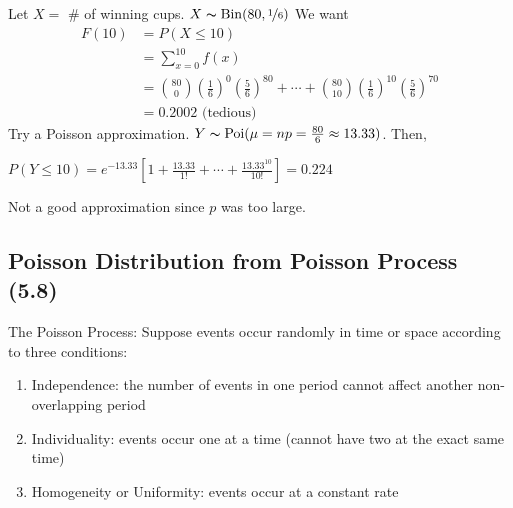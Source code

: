 Let $ X= $ \# of winning cups. $ X \thicksim \operatorname{Bin}(80,\nicefrac{1}{6}) $
We want
\begin{align*}
    F(10)&=P(X\le 10)\\
    &=\sum\limits_{x=0}^{10} f(x)\\
    &=\binom{80}{0}\left(\frac{1}{6}\right)^0\left(\frac{5}{6}\right)^{80}+\cdots+
    \binom{80}{10}\left(\frac{1}{6}\right)^{10}\left(\frac{5}{6}\right)^{70}\\
    &=0.2002 \text{ (tedious) }
\end{align*}
Try a Poisson approximation.
$ Y \thicksim \operatorname{Poi}(\mu=np=\frac{80}{6}\approx 13.33) $. Then, 

$ P(Y\le 10)=e^{-13.33}\left[1+\frac{13.33}{1!}+\cdots+\frac{13.33^10}{10!}\right]=0.224 $

Not a good approximation since $ p $ was too large.

\subsection{Poisson Distribution from Poisson Process (5.8)}
The Poisson Process: Suppose events occur randomly in time or space
according to three conditions:
\begin{enumerate}[(1)]
    \item Independence: the number of events in one period cannot affect another non-overlapping period
    \item Individuality: events occur one at a time (cannot have two at the exact same time)
    \item Homogeneity or Uniformity: events occur at a constant rate
\end{enumerate}